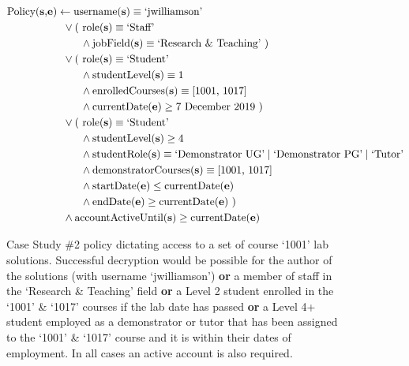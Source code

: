 \begin{figure}[ht]
  \centering
\begin{align*}
  \text{Policy(\textbf{s},\textbf{e})}
  &
    \leftarrow
    \text{username(\textbf{s})} \equiv \text{`jwilliamson'}
  \\
  &
    \phantom{::}\vee
    \text{( role(\textbf{s})} \equiv \text{`Staff'}
  \\
  &
    \phantom{::::::::}\wedge
    \text{jobField(\textbf{s})} \equiv \text{`Research \& Teaching' )}
  \\
  &
    \phantom{::}\vee
    \text{( role(\textbf{s})} \equiv \text{`Student'}
  \\
  &
    \phantom{::::::::}\wedge
    \text{studentLevel(\textbf{s})} \equiv \text{1}
  \\
  &
    \phantom{::::::::}\wedge
    \text{enrolledCourses(\textbf{s})} \equiv \text{[1001, 1017]}
  \\
  &
    \phantom{::::::::}\wedge
    \text{currentDate(\textbf{e})} \geq \text{7 December 2019 )}
  \\
  &
    \phantom{::}\vee
    \text{( role(\textbf{s})} \equiv \text{`Student'}
  \\
  &
    \phantom{::::::::}\wedge
    \text{studentLevel(\textbf{s})} \geq \text{4}
  \\
  &
    \phantom{::::::::}\wedge
    \text{studentRole(\textbf{s})} \equiv \text{`Demonstrator UG'} \mid \text{`Demonstrator PG'} \mid \text{`Tutor'}
  \\
  &
    \phantom{::::::::}\wedge
    \text{demonstratorCourses(\textbf{s})} \equiv \text{[1001, 1017]}
  \\
  &
    \phantom{::::::::}\wedge
    \text{startDate(\textbf{e})} \leq \text{currentDate(\textbf{e})}
  \\
  &
    \phantom{::::::::}\wedge
    \text{endDate(\textbf{e})} \geq \text{currentDate(\textbf{e}) )}
  \\
  &
    \phantom{::}\wedge
    \text{accountActiveUntil(\textbf{s})} \geq \text{currentDate(\textbf{e})}
\end{align*}
  \caption{
    \label{fig:case_study_policy_2}
    Case Study \#2 policy dictating access to a set of course `1001' lab solutions.
    Successful decryption would be possible for the author of the solutions (with username `jwilliamson') \textbf{or} a member of staff in the `Research \& Teaching' field \textbf{or} a Level 2 student enrolled in the `1001' \& `1017' courses if the lab date has passed \textbf{or} a Level 4+ student employed as a demonstrator or tutor that has been assigned to the `1001' \& `1017' course and it is within their dates of employment. In all cases an active account is also required.
  }
\end{figure}

